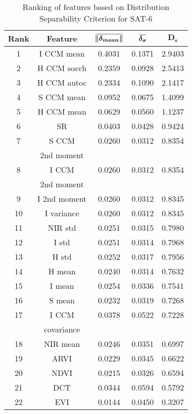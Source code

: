 \documentclass[11pt,a4paper]{article}
\newcommand{\overbar}[1]{\mkern 1.5mu\overline{\mkern-1.5mu#1\mkern-1.5mu}\mkern 1.5mu}
\begin{document}
\begin{table}[h!]
\centering
\begin{tabular}{ |c|c|c|c|c|}
    \hline
\textbf{Rank} & \textbf{Feature} & $\boldsymbol{\overbar{\lVert \delta_{mean} \rVert }}$  &  $\boldsymbol{\overbar{\delta_{\sigma}}}$ & $\boldsymbol{D_s}$  \\[1.5ex] \hline
 1&I CCM mean & 0.4031  & 0.1371  &  2.9403 \\ \hline
 2 & H CCM sosvh  &  0.2359   & 0.0928  &  2.5413   \\ \hline
 3 & H CCM autoc   &  0.2334    & 0.1090  &  2.1417  \\ \hline
 4 & S CCM mean    &   0.0952   & 0.0675  & 1.4099   \\ \hline
 5 &  H CCM mean    &  0.0629   & 0.0560  &  1.1237   \\ \hline
 6 &   SR    &  0.0403   & 0.0428  &   0.9424  \\ \hline
 7 &   S CCM     &   0.0260   & 0.0312  &  0.8354  \\ 
   &   2nd moment     &      &   &   \\ \hline
  8 &   I CCM   &  0.0260    & 0.0312  & 0.8354   \\
    &   2nd moment     &      &   &   \\ \hline
   9  &   I 2nd moment    &  0.0260    & 0.0312  &   0.8345 \\ \hline
    10   &  I variance    &   0.0260   & 0.0312  &  0.8345  \\ \hline
    11   &   NIR std    &  0.0251    & 0.0315  &  0.7980  \\ \hline
   12    &   I std     &  0.0251    & 0.0314  &  0.7968  \\ \hline
    13    &  H std      &  0.0252    & 0.0317  &  0.7956  \\ \hline
    14    &   H mean      &  0.0240   & 0.0314  &  0.7632   \\ \hline
     15   &    I mean      &  0.0254   &  0.0336 &  0.7541  \\ \hline
     16   &    S mean       &   0.0232   & 0.0319  &  0.7268  \\ \hline
      17     &   I CCM       &   0.0378    &  0.0522 &  0.7228  \\ 
        &   covariance     &      &   &   \\ \hline
       18     &   NIR mean      &  0.0246     & 0.0351  &  0.6997 \\ \hline
       19      &   ARVI      &  0.0229    &  0.0345 &   0.6622 \\ \hline
        20      &   NDVI      &   0.0215    & 0.0326  &  0.6594 \\ \hline
         21     &    DCT      &   0.0344    &  0.0594 &  0.5792 \\ \hline
          22     &    EVI      &    0.0144   & 0.0450  & 0.3207  \\ \hline
  \end{tabular}
  \caption{Ranking of features based on Distribution Separability Criterion for SAT-6}
  \label{table:Feature_ranking}
\end{table}
\end{document}
